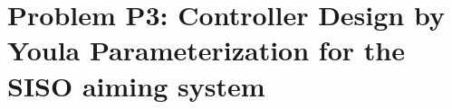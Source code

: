 \documentclass{tron}
\begin{document}
\maketitle
 \tableofcontents
\clearpage
{}
\setcounter{page}{1}
\setlength{\parskip}{5pt}
\newpage


\section{Problem P3: Controller Design by Youla Parameterization for the SISO aiming system}
\end{document}

